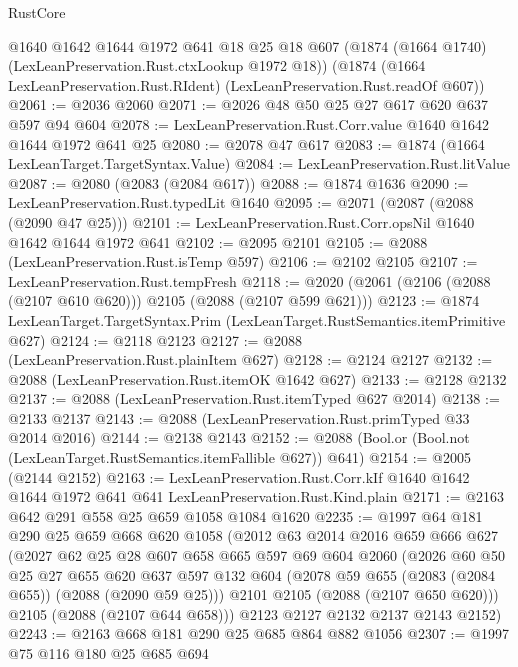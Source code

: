 \begin{lexlean}{RustCore}
\begin{coremodule}
    @1640
    @1642
    @1644
    @1972
    @641
    @18
    @25
    @18
    @607
    (@1874 (@1664 @1740) (LexLeanPreservation.Rust.ctxLookup @1972 @18))
    (@1874 (@1664 LexLeanPreservation.Rust.RIdent) (LexLeanPreservation.Rust.readOf @607))
@2061 := @2036 @2060
@2071 := @2026 @48 @50 @25 @27 @617 @620 @637 @597 @94 @604
@2078 := LexLeanPreservation.Rust.Corr.value @1640 @1642 @1644 @1972 @641 @25
@2080 := @2078 @47 @617
@2083 := @1874 (@1664 LexLeanTarget.TargetSyntax.Value)
@2084 := LexLeanPreservation.Rust.litValue
@2087 := @2080 (@2083 (@2084 @617))
@2088 := @1874 @1636
@2090 := LexLeanPreservation.Rust.typedLit @1640
@2095 := @2071 (@2087 (@2088 (@2090 @47 @25)))
@2101 := LexLeanPreservation.Rust.Corr.opsNil @1640 @1642 @1644 @1972 @641
@2102 := @2095 @2101
@2105 := @2088 (LexLeanPreservation.Rust.isTemp @597)
@2106 := @2102 @2105
@2107 := LexLeanPreservation.Rust.tempFresh
@2118 := @2020 (@2061 (@2106 (@2088 (@2107 @610 @620))) @2105 (@2088 (@2107 @599 @621)))
@2123 := @1874 LexLeanTarget.TargetSyntax.Prim (LexLeanTarget.RustSemantics.itemPrimitive @627)
@2124 := @2118 @2123
@2127 := @2088 (LexLeanPreservation.Rust.plainItem @627)
@2128 := @2124 @2127
@2132 := @2088 (LexLeanPreservation.Rust.itemOK @1642 @627)
@2133 := @2128 @2132
@2137 := @2088 (LexLeanPreservation.Rust.itemTyped @627 @2014)
@2138 := @2133 @2137
@2143 := @2088 (LexLeanPreservation.Rust.primTyped @33 @2014 @2016)
@2144 := @2138 @2143
@2152 := @2088 (Bool.or (Bool.not (LexLeanTarget.RustSemantics.itemFallible @627)) @641)
@2154 := @2005 (@2144 @2152)
@2163 := LexLeanPreservation.Rust.Corr.kIf
    @1640
    @1642
    @1644
    @1972
    @641
    @641
    LexLeanPreservation.Rust.Kind.plain
@2171 := @2163 @642 @291 @558 @25 @659 @1058 @1084 @1620
@2235 := @1997
    @64
    @181
    @290
    @25
    @659
    @668
    @620
    @1058
    (@2012
      @63
      @2014
      @2016
      @659
      @666
      @627
      (@2027
        @62
        @25
        @28
        @607
        @658
        @665
        @597
        @69
        @604
        @2060
        (@2026
          @60
          @50
          @25
          @27
          @655
          @620
          @637
          @597
          @132
          @604
          (@2078 @59 @655 (@2083 (@2084 @655)) (@2088 (@2090 @59 @25)))
          @2101
          @2105
          (@2088 (@2107 @650 @620)))
        @2105
        (@2088 (@2107 @644 @658)))
      @2123
      @2127
      @2132
      @2137
      @2143
      @2152)
@2243 := @2163 @668 @181 @290 @25 @685 @864 @882 @1056
@2307 := @1997
    @75
    @116
    @180
    @25
    @685
    @694

\end{coremodule}
\end{lexlean}
